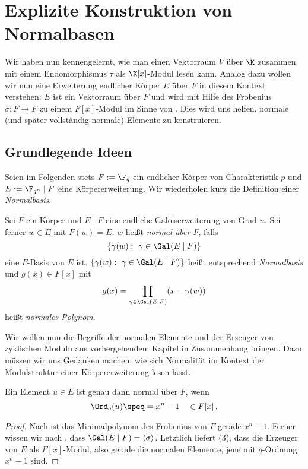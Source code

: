 \chapter{Explizite Konstruktion von Normalbasen}

Wir haben nun kennengelernt, wie man einen 
Vektorraum $V$ über $\K$ zusammen mit einem Endomorphismus $\tau$ als
$\K[x]$-Modul lesen kann. Analog dazu wollen wir nun eine Erweiterung
endlicher Körper $E$ über $F$ in diesem Kontext verstehen: $E$ ist ein
Vektorraum über $F$ und wird mit Hilfe des Frobenius 
$\sigma: \bar F \to \bar F$ zu einem $F[x]$-Modul im Sinne von 
. Dies wird uns helfen, normale (und später vollständig
normale) Elemente zu konstruieren.

\section{Grundlegende Ideen}

Seien im Folgenden stets $F := \F_q$ ein endlicher Körper von 
Charakteristik $p$ und $E := \F_{q^n} \mid F$ eine Körpererweiterung.
Wir wiederholen kurz die Definition einer \emph{Normalbasis}.

\begin{definition}
  \label{def:normal}
  Sei $F$ ein Körper und $E \mid F$ eine endliche Galoiserweiterung von Grad
  $n$. Sei ferner $w\in E$ mit $F(w) = E$. $w$ heißt \emph{normal über $F$},
  falls
  \[ \{ \gamma(w):\ \gamma \in \Gal(E\mid F) \}\]
  eine $F$-Basis von $E$ ist. 
  $\{ \gamma(w):\ \gamma \in \Gal(E\mid F)\}$ heißt entsprechend 
  \emph{Normalbasis} und $g(x) \in F[x]$ mit 
  \[ g(x) = \prod_{\gamma \in \Gal(E\mid F)}(x - \gamma(w))\]
  heißt \emph{normales Polynom}.
\end{definition}

Wir wollen nun die Begriffe der normalen Elemente und der Erzeuger von
zyklischen Moduln aus vorhergehendem Kapitel in Zusammenhang bringen. Dazu
müssen wir uns Gedanken machen, wie sich Normalität im Kontext der
Modulstruktur einer Körpererweiterung lesen lässt.

\begin{satz}
  Ein Element $u\in E$ ist genau dann normal über $F$, wenn
  \[ \Ord_q(u) \speq= x^n-1 \quad\in F[x]\,.\]
\end{satz}
\begin{proof}
  Nach  ist das Minimalpolynom des Frobenius von $F$
  gerade $x^n-1$. Ferner wissen wir nach ,
  dass $\Gal(E\mid F) = \langle\sigma\rangle$. 
  Letztlich liefert  (3), dass die Erzeuger von 
  $E$ als $F[x]$-Modul, also gerade die normalen Elemente, jene mit $q$-Ordnung
  $x^n-1$ sind.
\end{proof}

